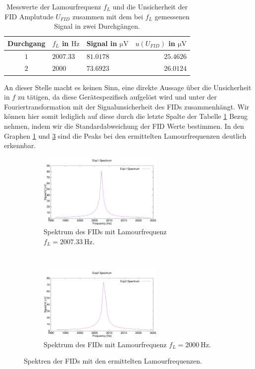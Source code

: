 \documentclass{article}
\begin{document}
    \begin{table}[h]
        \centering
        \begin{tabular}{c|l|l|r}
            \textbf{Durchgang} & $f_L$ in $\si{\hertz}$ & Signal in $\si{\micro\volt}$ & $u(U_{\textit{FID}})$ in $\si{\micro\volt}$\\
            \hline
            $1$ & $2007.33$ & $81.0178$ & $25.4626$\\
            $2$ & $2000$ & $73.6923$ & $26.0124$
        \end{tabular}
        \caption{Messwerte der Lamourfrequenz $f_L$ und die Unsicherheit der FID Amplutude $U_{\textit{FID}}$ zusammen mit dem bei $f_L$ gemessenen Signal in zwei Durchgängen.}
        \label{tab:2:Lamour_Freq}
    \end{table}
    An dieser Stelle macht es keinen Sinn, eine direkte Aussage über die Unsicherheit in $f$ zu tätigen, da diese Gerätespezifisch aufgelöst wird und unter der Fouriertransformation mit der Signalunsicherheit des FIDs zusammenhängt. Wir können hier somit lediglich auf diese durch die letzte Spalte der Tabelle \ref{tab:2:Lamour_Freq} Bezug nehmen, indem wir die Standardabweichung der FID Werte bestimmen. In den Graphen \ref{fig:2:Spectrum-1} und \ref{fig:2:Spectrum-2} sind die Peaks bei den ermittelten Lamourfrequenzen deutlich erkennbar.
    \begin{figure}[h]
        \centering
        \begin{subfigure}[b]{0.4\textwidth}
            \includegraphics[width=6cm]{../Bilddateien/Exp1_Spectrum.png}
            \caption{Spektrum des FIDs mit Lamourfrequenz $f_L = \SI{2007.33}{\hertz}$.}
            \label{fig:2:Spectrum-1}
        \end{subfigure}
        \
        \begin{subfigure}[b]{0.4\textwidth}
            \includegraphics[width=6cm]{../Bilddateien/Exp2_Spectrum.png}
            \caption{Spektrum des FIDs mit Lamourfrequenz $f_L = \SI{2000}{\hertz}$.}
            \label{fig:2:Spectrum-2}
        \end{subfigure}
        \caption{Spektren der FIDs mit den ermittelten Lamourfrequenzen.}
    \end{figure}
\end{document}
